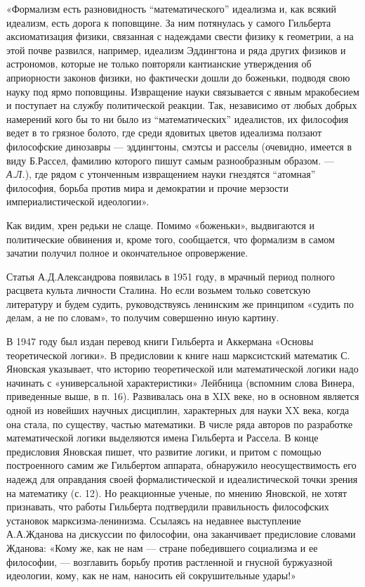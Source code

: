 «Формализм  есть разновидность  ``математического''  идеализма и,  как
всякий  идеализм,  есть  дорога  к  поповщине.  За  ним  потянулась  у
самого Гильберта  аксиоматизация физики, связанная с  надеждами свести
физику  к геометрии,  а  на этой  почве  развился, например,  идеализм
Эддингтона  и ряда  других  физиков и  астрономов,  которые не  только
повторяли кантианские  утверждения об  априорности законов  физики, но
фактически дошли до  боженьки, подводя свою науку  под ярмо поповщины.
Извращение науки связывается с явным мракобесием и поступает на службу
политической реакции.  Так, независимо от любых  добрых намерений кого
бы то ни  было из ``математических'' идеалистов, их  философия ведет в
то  грязное  болото,  где  среди  ядовитых  цветов  идеализма  ползают
философские  динозавры ---  эддингтоны,  смэтсы  и расселы  (очевидно,
имеется в  виду Б.Рассел,  фамилию которого пишут  самым разнообразным
образом. ---  \emph{А.Л.}), где  рядом с утонченным  извращением науки
гнездятся  ``атомная'' философия,  борьба против  мира и  демократии и
прочие мерзости империалистической идеологии».

Как  видим, хрен  редьки не  слаще. Помимо  «боженьки», выдвигаются  и
политические  обвинения и,  кроме  того, сообщается,  что формализм  в
самом зачатии получил полное и окончательное опровержение.

Статья  А.Д.Александрова  появилась  в  1951 году,  в  мрачный  период
полного  расцвета  культа личности  Сталина.  Но  если возьмем  только
советскую  литературу  и  будем судить,  руководствуясь  ленинским  же
принципом «судить  по делам,  а не по  словам», то  получим совершенно
иную картину.

В  1947 году  был издан  перевод книги  Гильберта и  Аккермана «Основы
теоретической  логики».   В  предисловии  к  книге   наш  марксистский
математик  С.  Яновская  указывает,   что  историю  теоретической  или
математической логики  надо начинать с  «универсальной характеристики»
Лейбница  (вспомним   слова  Винера,  приведенные  выше,   в  п.  16).
Развивалась она в  XIX веке, но в основном является  одной из новейших
научных дисциплин, характерных для науки  XX века, когда она стала, по
существу,  частью  математики.  В  числе ряда  авторов  по  разработке
математической логики  выделяются имена  Гильберта и Рассела.  В конце
предисловия Яновская  пишет, что развитие  логики, и притом  с помощью
построенного самим же Гильбертом аппарата, обнаружило неосуществимость
его  надежд для  оправдания своей  формалистической и  идеалистической
точки зрения на  математику (с. 12). Но реакционные  ученые, по мнению
Яновской,  не  хотят  признавать,  что  работы  Гильберта  подтвердили
правильность  философских установок  марксизма-ленинизма. Ссылаясь  на
недавнее  выступление  А.А.Жданова  на  дискуссии  по  философии,  она
заканчивает  предисловие словами  Жданова: «Кому  же, как  не нам  ---
стране победившего  социализма и  ее философии, ---  возглавить борьбу
против растленной  и гнусной буржуазной  идеологии, кому, как  не нам,
наносить ей сокрушительные удары!»

